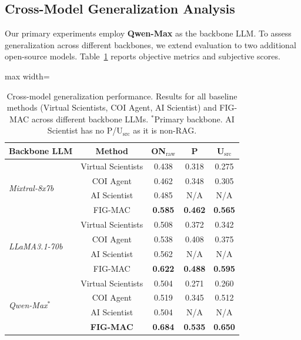\documentclass[runningheads]{llncs}
\begin{document}
\subsection{Cross-Model Generalization Analysis}
\label{sec:cross_model}

Our primary experiments employ \textbf{Qwen-Max} as the backbone LLM. To assess generalization across different backbones, we extend evaluation to two additional open-source models. Table~\ref{tab:cross_model} reports objective metrics and subjective scores.

\begin{table}[t]
\centering
\small
\begin{adjustbox}{max width=\textwidth}
\begin{tabular}{lcccc}
\toprule
\textbf{Backbone LLM} & \textbf{Method} & \textbf{ON$_{\text{raw}}$} & \textbf{P} & \textbf{U$_{\text{src}}$} \\
\midrule
\multirow{4}{*}{\textit{Mixtral-8x7b}} 
 & Virtual Scientists & 0.438 & 0.318 & 0.275 \\
 & COI Agent & 0.462 & 0.348 & 0.305 \\
 & AI Scientist & 0.485 & N/A & N/A \\
 & FIG-MAC & \textbf{0.585} & \textbf{0.462} & \textbf{0.565} \\
\midrule
\multirow{4}{*}{\textit{LLaMA3.1-70b}} 
 & Virtual Scientists & 0.508 & 0.372 & 0.342 \\
 & COI Agent & 0.538 & 0.408 & 0.375 \\
 & AI Scientist & 0.562 & N/A & N/A \\
 & FIG-MAC & \textbf{0.622} & \textbf{0.488} & \textbf{0.595} \\
\midrule
\multirow{4}{*}{\textit{Qwen-Max}$^*$} 
 & Virtual Scientists & 0.504 & 0.271 & 0.260 \\
 & COI Agent & 0.519 & 0.345 & 0.512 \\
 & AI Scientist & 0.504 & N/A & N/A \\
 & \textbf{FIG-MAC} & \textbf{0.684} & \textbf{0.535} & \textbf{0.650} \\
\bottomrule
\end{tabular}
\end{adjustbox}
\caption{Cross-model generalization performance. Results for all baseline methods (Virtual Scientists, COI Agent, AI Scientist) and FIG-MAC across different backbone LLMs. $^*$Primary backbone. AI Scientist has no P/U$_{\text{src}}$ as it is non-RAG.}
\label{tab:cross_model}
\end{table}
\end{document}
